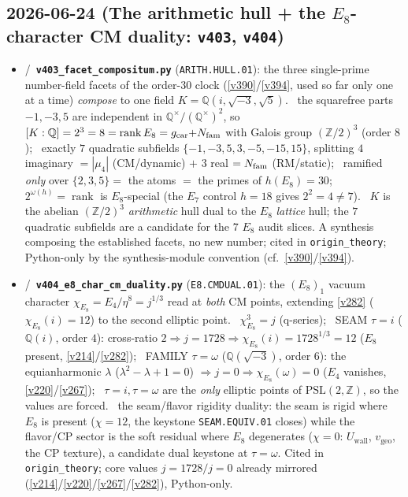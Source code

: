 \subsection*{2026-06-24 (The arithmetic hull + the $E_8$-character CM duality: \texttt{v403}, \texttt{v404})}
\begin{itemize}
\item \mE/\mC\ \textbf{\texttt{v403\_facet\_compositum.py}} (\texttt{ARITH.HULL.01}): the three single-prime number-field facets of the order-$30$ clock (\vref{v390}/\vref{v394}, used so far only one at a time) \emph{compose} to one field $K=\mathbb Q(i,\sqrt{-3},\sqrt5)$. \mE\ the squarefree parts $-1,-3,5$ are independent in $\mathbb Q^\times/(\mathbb Q^\times)^2$, so $[K:\mathbb Q]=2^3=8=\operatorname{rank}E_8=g_{\mathrm{car}}{+}N_{\mathrm{fam}}$ with Galois group $(\mathbb Z/2)^3$ (order $8$); \mE\ exactly $7$ quadratic subfields $\{-1,-3,5,3,-5,-15,15\}$, splitting $4$ imaginary $=|\mu_4|$ (CM/dynamic) $+$ $3$ real $=N_{\mathrm{fam}}$ (RM/static); \mE\ ramified \emph{only} over $\{2,3,5\}=$ the atoms $=$ the primes of $h(E_8)=30$; \mE\ $2^{\omega(h)}=\operatorname{rank}$ is $E_8$-special (the $E_7$ control $h=18$ gives $2^2=4\neq7$). \mC\ $K$ is the abelian $(\mathbb Z/2)^3$ \emph{arithmetic} hull dual to the $E_8$ \emph{lattice} hull; the $7$ quadratic subfields are a candidate for the $7$ $E_8$ audit slices. A synthesis composing the established facets, no new number; cited in \texttt{origin\_theory}; Python-only by the synthesis-module convention (cf.\ \vref{v390}/\vref{v394}).
\item \mE/\mC\ \textbf{\texttt{v404\_e8\_char\_cm\_duality.py}} (\texttt{E8.CMDUAL.01}): the $(E_8)_1$ vacuum character $\chi_{E_8}=E_4/\eta^8=j^{1/3}$ read at \emph{both} CM points, extending \vref{v282} ($\chi_{E_8}(i)=12$) to the second elliptic point. \mE\ $\chi_{E_8}^3=j$ (q-series); \mE\ SEAM $\tau{=}i$ ($\mathbb Q(i)$, order $4$): cross-ratio $2\Rightarrow j=1728\Rightarrow\chi_{E_8}(i)=1728^{1/3}=12$ ($E_8$ present, \vref{v214}/\vref{v282}); \mE\ FAMILY $\tau{=}\omega$ ($\mathbb Q(\sqrt{-3})$, order $6$): the equianharmonic $\lambda$ ($\lambda^2{-}\lambda{+}1=0$) $\Rightarrow j=0\Rightarrow\chi_{E_8}(\omega)=0$ ($E_4$ vanishes, \vref{v220}/\vref{v267}); \mE\ $\tau{=}i,\tau{=}\omega$ are the \emph{only} elliptic points of $\mathrm{PSL}(2,\mathbb Z)$, so the values are forced. \mC\ the seam/flavor rigidity duality: the seam is rigid where $E_8$ is present ($\chi=12$, the keystone \texttt{SEAM.EQUIV.01} closes) while the flavor/CP sector is the soft residual where $E_8$ degenerates ($\chi=0$: $U_{\mathrm{wall}}$, $v_{\mathrm{geo}}$, the CP texture), a candidate dual keystone at $\tau{=}\omega$. Cited in \texttt{origin\_theory}; core values $j=1728/j=0$ already mirrored (\vref{v214}/\vref{v220}/\vref{v267}/\vref{v282}), Python-only.
\end{itemize}

